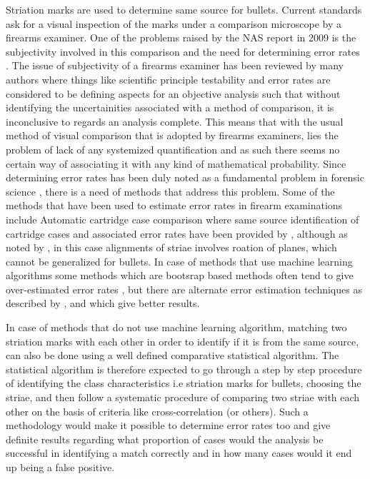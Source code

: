 \documentclass[12pt]{article}
\begin{document}
Striation marks are used to determine same source for bullets. Current
standards ask for a visual inspection of the marks under a comparison
microscope by a firearms examiner. One of the problems raised by the NAS
report in 2009 is the subjectivity involved in this comparison and the
need for determining error rates \citet{NAS:2009}. The issue of
subjectivity of a firearms examiner has been reviewed by many authors
where things like scientific principle testability and error rates are
considered to be defining aspects for an objective analysis such that
without identifying the uncertainities associated with a method of
comparison, it is inconclusive to regards an analysis complete. This
means that with the usual method of visual comparison that is adopted by
firearms examiners, lies the problem of lack of any systemized
quantification and as such there seems no certain way of associating it
with any kind of mathematical probability. Since determining error rates
has been duly noted as a fundamental problem in forensic science
\citet{NAS:2009}, there is a need of methods that address this problem.
Some of the methods that have been used to estimate error rates in
firearm examinations include Automatic cartridge case comparison where
same source identification of cartridge cases and associated error rates
have been provided by \citet{riva}, although as noted by \citet{aoas},
in this case alignments of striae involves roation of planes, which
cannot be generalized for bullets. In case of methods that use machine
learning algorithms some methods which are bootsrap based methods often
tend to give over-estimated error rates \citet{efron}, but there are
alternate error estimation techniques as described by \citet{aoas},
\citet{efron} and \citet{vorburger2016} which give better results.

In case of methods that do not use machine learning algorithm, matching
two striation marks with each other in order to identify if it is from
the same source, can also be done using a well defined comparative
statistical algorithm. The statistical algorithm is therefore expected
to go through a step by step procedure of identifying the class
characteristics i.e striation marks for bullets, choosing the striae,
and then follow a systematic procedure of comparing two striae with each
other on the basis of criteria like cross-correlation (or others). Such
a methodology would make it possible to determine error rates too and
give definite results regarding what proportion of cases would the
analysis be successful in identifying a match correctly and in how many
cases would it end up being a false positive.
\end{document}
